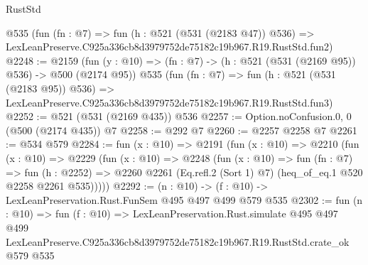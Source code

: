 \begin{lexlean}{RustStd}
\begin{coremodule}
    @535
    (fun (fn : @7) =>
    fun (h : @521 (@531 (@2183 @47)) @536) =>
    LexLeanPreserve.C925a336cb8d3979752de75182c19b967.R19.RustStd.fun2)
@2248 := @2159
    (fun (y : @10) => (fn : @7) -> (h : @521 (@531 (@2169 @95)) @536) -> @500 (@2174 @95))
    @535
    (fun (fn : @7) =>
    fun (h : @521 (@531 (@2183 @95)) @536) =>
    LexLeanPreserve.C925a336cb8d3979752de75182c19b967.R19.RustStd.fun3)
@2252 := @521 (@531 (@2169 @435)) @536
@2257 := Option.noConfusion.{0, 0} (@500 (@2174 @435)) @7
@2258 := @292 @7
@2260 := @2257 @2258 @7
@2261 := @534 @579
@2284 := fun (x : @10) =>
  @2191
    (fun (x : @10) =>
    @2210
      (fun (x : @10) =>
      @2229
        (fun (x : @10) =>
        @2248
          (fun (x : @10) =>
          fun (fn : @7) =>
          fun (h : @2252) =>
          @2260 @2261 (Eq.refl.{2} (Sort 1) @7) (heq_of_eq.{1} @520 @2258 @2261 @535)))))
@2292 := (n : @10) -> (f : @10) -> LexLeanPreservation.Rust.FunSem @495 @497 @499 @579 @535
@2302 := fun (n : @10) =>
  fun (f : @10) =>
  LexLeanPreservation.Rust.simulate
    @495
    @497
    @499
    LexLeanPreserve.C925a336cb8d3979752de75182c19b967.R19.RustStd.crate_ok
    @579
    @535
\end{coremodule}
\end{lexlean}
